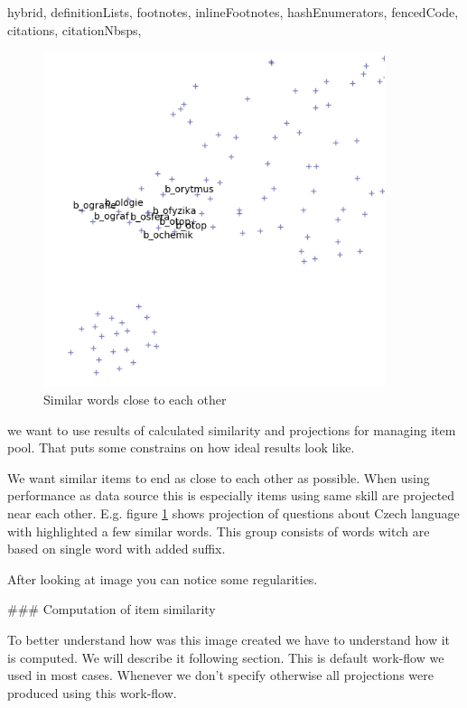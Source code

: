 \documentclass[
  digital, %
  table,   %
  nolof,     %
  nolot,     %
  nocover
]{fithesis3}
\begin{document}
\begin{markdown*}{%
  hybrid,
  definitionLists,
  footnotes,
  inlineFootnotes,
  hashEnumerators,
  fencedCode,
  citations,
  citationNbsps,
}
\begin{figure}
  \begin{center}
    \includegraphics[width=10cm]{img/similar_words}
  \end{center}
  \caption{Similar words close to each other}
  \label{similarwords}
\end{figure}

we want to use results of calculated similarity and projections for managing item pool. That puts some constrains on how ideal results look like.

We want similar items to end as close to each other as possible. When using performance as data source this is especially items using same skill are projected near each other. E.g. figure \ref{similarwords} shows projection of questions about Czech language with highlighted a few similar words. This group consists of words witch are based on single word with added suffix.



After looking at image you can notice some regularities.

### Computation of item similarity

To better understand how was this image created we have to understand how it is computed. We will describe it following section. This is default work-flow we used in most cases. Whenever we don't specify otherwise all projections were produced using this work-flow.



\end{markdown*}
\end{document}
